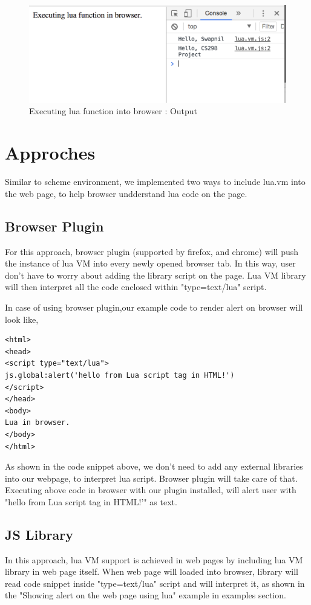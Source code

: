 \begin{figure}[H]
	\begin{center}
		\includegraphics[width=\linewidth]{./images/lua-functions.png}
	\end{center}
	\caption{Executing lua function into browser : Output}
	\label{fig:luafunction}
\end{figure}


\section{Approches}

Similar to scheme environment, we implemented two ways to include lua.vm into the web page, to help browser undderstand lua code on the page.


\subsection{Browser Plugin } 
For this approach, browser plugin (supported by firefox, and chrome) will push the instance of lua VM into every newly opened browser tab. In this way, user don't have to worry about adding the library script on the page. Lua VM library will then interpret all the code enclosed within "type=text/lua" script.

In case of using browser plugin,our example code to render alert on browser will look like, 

\begin{lstlisting}[frame=single]
<html>
<head>
<script type="text/lua">
js.global:alert('hello from Lua script tag in HTML!') 
</script>
</head>
<body>
Lua in browser.
</body>
</html>
\end{lstlisting}


As shown in the code snippet above, we don't need to add any external libraries into our webpage, to interpret lua script. Browser plugin will take care of that.
Executing above code in browser with our plugin installed, will alert user with "hello from Lua script tag in HTML!'" as text.


\subsection{JS Library}


In this approach, lua VM support is achieved in web pages by including lua VM library in web page itself. When web page will loaded into browser,  library will read code snippet inside "type=text/lua" script and will interpret it, as shown in the "Showing alert on the web page using lua" example in examples section. 
